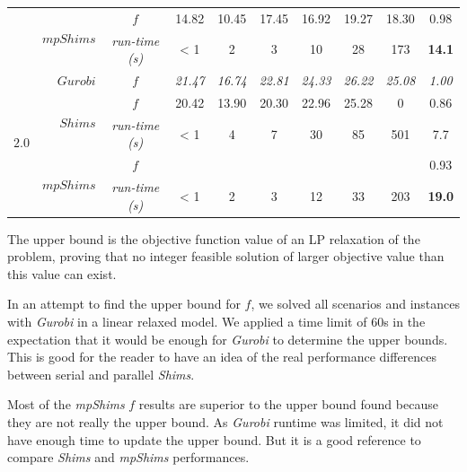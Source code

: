 \documentclass[preprint,authoryear]{elsarticle}
\begin{document}
\begin{table}[H]
\begin{tabular}{crcccccccc}
\cmidrule{2-10}		                       
&\multirow{2}{*}{ $mpShims$}                     & $f$                & 14.82 & 10.45       & 17.45 & 16.92       & 19.27       & 18.30  & 0.98\\%
&                                                & {\it run-time (s)} &  < 1        &  2          &    3        &   10        &   28        &   173        & {\bf 14.1}\\%

\midrule
\multirow{6}{*}{$2.0$}&\multirow{1}{*}{ $Gurobi$}& $f$                &{\it 21.47}   &{\it 16.74}   &{\it 22.81}  &{\it 24.33}  &{\it 26.22}   &{\it 25.08}  & {\it 1.00} \\%

\cmidrule{2-10}		                       
&\multirow{2}{*}{ $Shims$}                       & $f$                &   20.42     &   13.90     &  20.30      &  22.96      &   25.28     &   0      & 0.86\\%
&                                                & {\it run-time (s)} &  < 1        &  4          &    7        &   30        &   85        &  501         & 7.7\\%

\cmidrule{2-10}		                       
&\multirow{2}{*}{ $mpShims$}                     & $f$                &        &        &        &        &        &         &  0.93\\%
&                                                & {\it run-time (s)} &  < 1        &  2          &    3        &   12        &   33        &  203         & {\bf 19.0}\\%

\bottomrule	

\end{tabular}
\normalsize
\end{table}

The upper bound is the objective function value of an LP relaxation of the problem, proving that no integer feasible solution of larger objective value than this value can exist.

In an attempt to find the upper bound for $f$, we solved all scenarios and instances with {\it Gurobi} in a linear relaxed model. We applied a time limit of 60s in the expectation that it would be enough for {\it Gurobi} to determine the upper bounds. This is good for the reader to have an idea of the real performance differences between serial and parallel {\it Shims}.

Most of the {\it mpShims} $f$ results are superior to the upper bound found because they are not really the upper bound. As {\it Gurobi} runtime was limited, it did not have enough time to update the upper bound. But it is a good reference to compare {\it Shims} and {\it mpShims} performances.
\end{document}
